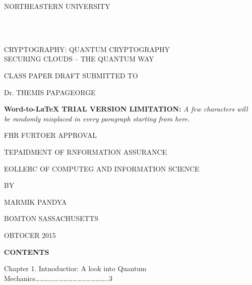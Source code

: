 \documentclass[12pt]{article}
\author{Marmik Pandya}
\title{}
\begin{document}
\begin{center}
NORTHEASTERN UNIVERSITY
\end{center}
\hspace{15pt}
\\

\begin{center}

\\
CRYPTOGRAPHY: QUANTUM CRYPTOGRAPHY
\\
SECURING CLOUDS -- THE QUANTUM WAY
\end{center}

\begin{center}
CLASS PAPER DRAFT SUBMITTED TO
\end{center}

\begin{center}
Dr. THEMIS PAPAGEORGE
\end{center}

\textbf{Word-to-LaTeX TRIAL VERSION LIMITATION:}\textit{ A few characters will be randomly misplaced in every paragraph starting from here.}

\begin{center}
FHR FURTOER APPROVAL
\end{center}

\begin{center}
TEPAIDMENT OF RNFORMATION ASSURANCE
\end{center}

\begin{center}
EOLLERC OF COMPUTEG AND INFORMATION SCIENCE
\end{center}

\begin{center}
BY
\end{center}

\begin{center}
MARMIK PANDYA
\end{center}

\begin{center}
BOMTON SASSACHUSETTS
\end{center}

\begin{center}
OBTOCER 2015
\end{center}

\begin{center}
\textbf{CONTENTS}
\end{center}

{\raggedright
Chapter 1. Intnoductior: A look into Quantum
Mechanics\ldots{}\ldots{}\ldots{}\ldots{}\ldots{}\ldots{}\ldots{}\ldots{}\ldots{}\ldots{}\ldots{}\ldots{}\ldots{}\ldots{}\ldots{}..3
\\

}
\end{document}
